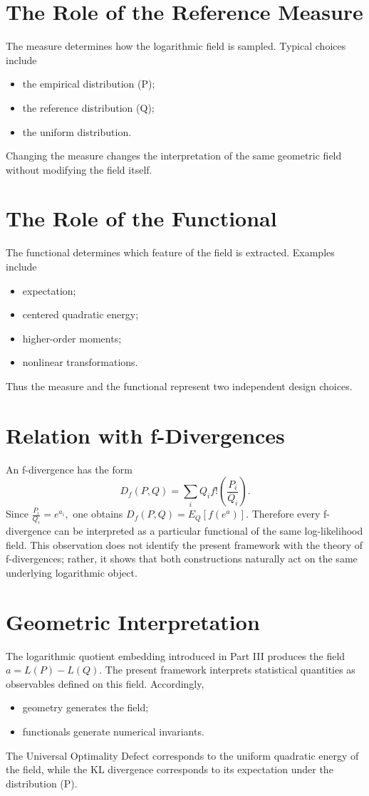 \section{The Role of the Reference Measure}
The measure determines how the logarithmic field is sampled.
Typical choices include
\begin{itemize}
  \item the empirical distribution (P);
  \item the reference distribution (Q);
  \item the uniform distribution.
\end{itemize}
Changing the measure changes the interpretation of the same geometric
field without modifying the field itself.
\section{The Role of the Functional}
The functional determines which feature of the field is extracted.
Examples include
\begin{itemize}
  \item expectation;
  \item centered quadratic energy;
  \item higher-order moments;
  \item nonlinear transformations.
\end{itemize}
Thus the measure and the functional represent two independent design
choices.
\section{Relation with f-Divergences}
An f-divergence has the form
\[ D_f(P,Q) = \sum_{i} Q_i
f!\left(\frac{P_i}{Q_i}\right). \]
Since
$\frac{P_i}{Q_i}=e^{a_i},$
one obtains
$D_f(P,Q) = E_Q[f(e^{a})].$
Therefore every f-divergence can be interpreted as a particular
functional of the same log-likelihood field.
This observation does not identify the present framework with the theory
of f-divergences; rather, it shows that both constructions naturally act
on the same underlying logarithmic object.
\section{Geometric Interpretation}
The logarithmic quotient embedding introduced in Part III produces the
field
$a=L(P)-L(Q).$
The present framework interprets statistical quantities as observables
defined on this field.
Accordingly,
\begin{itemize}
  \item geometry generates the field;
  \item functionals generate numerical invariants.
\end{itemize}
The Universal Optimality Defect corresponds to the uniform quadratic
energy of the field, while the KL divergence corresponds to its
expectation under the distribution (P).

